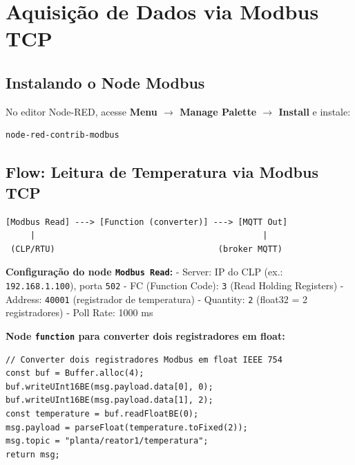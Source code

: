\section{Aquisição de Dados via Modbus TCP}\label{aquisiuxe7uxe3o-de-dados-via-modbus-tcp}

\subsection{Instalando o Node Modbus}\label{instalando-o-node-modbus}

No editor Node-RED, acesse \textbf{Menu \ensuremath{\rightarrow} Manage Palette \ensuremath{\rightarrow} Install} e instale:

\begin{lstlisting}
node-red-contrib-modbus
\end{lstlisting}

\subsection{Flow: Leitura de Temperatura via Modbus TCP}\label{flow-leitura-de-temperatura-via-modbus-tcp}

\begin{lstlisting}
[Modbus Read] ---> [Function (converter)] ---> [MQTT Out]
     |                                              |
 (CLP/RTU)                                 (broker MQTT)
\end{lstlisting}

\textbf{Configuração do node \passthrough{\lstinline!Modbus Read!}:}
- Server: IP do CLP (ex.: \passthrough{\lstinline!192.168.1.100!}), porta \passthrough{\lstinline!502!}
- FC (Function Code): \passthrough{\lstinline!3!} (Read Holding Registers)
- Address: \passthrough{\lstinline!40001!} (registrador de temperatura)
- Quantity: \passthrough{\lstinline!2!} (float32 = 2 registradores)
- Poll Rate: 1000 ms

\textbf{Node \passthrough{\lstinline!function!} para converter dois registradores em float:}

\begin{lstlisting}
// Converter dois registradores Modbus em float IEEE 754
const buf = Buffer.alloc(4);
buf.writeUInt16BE(msg.payload.data[0], 0);
buf.writeUInt16BE(msg.payload.data[1], 2);
const temperature = buf.readFloatBE(0);
msg.payload = parseFloat(temperature.toFixed(2));
msg.topic = "planta/reator1/temperatura";
return msg;
\end{lstlisting}

